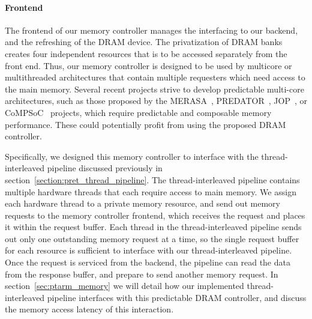 \paragraph{Frontend}
The frontend of our memory controller manages the interfacing to our backend, and the refreshing of the DRAM device.
The privatization of DRAM banks creates four independent resources that is to be accessed separately from the front end.
Thus, our memory controller is designed to be used by multicore or multithreaded architectures that contain multiple requesters which need access to the main memory.
Several recent projects strive to develop predictable multi-core architectures, such as those proposed by the MERASA~\cite{Ungerer10}, PREDATOR~\cite{Wilhelm09}, JOP~\cite{Schoeberl2008265}, or CoMPSoC~\cite{Hansson09} projects, which require predictable and composable memory performance.
These could potentially profit from using the proposed DRAM controller.

Specifically, we designed this memory controller to interface with the thread-interleaved pipeline discussed previously in section~\ref{section:pret_thread_pipeline}.
The thread-interleaved pipeline contains multiple hardware threads that each require access to main memory. 
We assign each hardware thread to a private memory resource, and send out memory requests to the memory controller frontend, which receives the request and places it within the request buffer.
Each thread in the thread-interleaved pipeline sends out only one outstanding memory request at a time, so the single request buffer for each resource is sufficient to interface with our thread-interleaved pipeline.
Once the request is serviced from the backend, the pipeline can read the data from the response buffer, and prepare to send another memory request.    
In section~\ref{sec:ptarm_memory} we will detail how our implemented thread-interleaved pipeline interfaces with this predictable DRAM controller, and discuss the memory access latency of this interaction.


